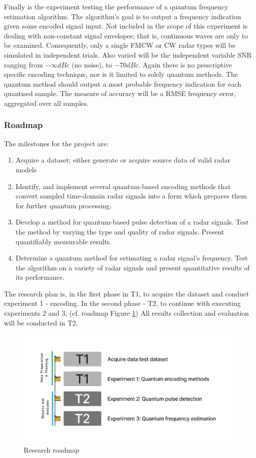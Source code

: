 Finally is the experiment testing the performance of a quantum frequency estimation algorithm.
The algorithm's goal is to output a frequency indication given some encoded signal input.
Not included in the scope of this experiment is dealing with non-constant signal envelopes; that is, continuous waves are only to be examined.
Consequently, only a single \ac{FMCW} or \ac{CW} radar types will be simulated in independent trials.
Also varied will be the independent variable \ac{SNR} ranging from $-\infty dBc$ (no noise), to $-70dBc$.
Again there is no prescriptive specific encoding technique, nor is it limited to solely quantum
methods.
The quantum method should output a most probable frequency indication for each quantised sample.
The measure of accuracy will be a \ac{RMSE} frequency error, aggregated over all samples. 


\subsubsection{Roadmap}\label{sec:research_plan}
The milestones for the project are:
\begin{enumerate}
    \item Acquire a dataset; either generate or acquire source data of valid radar models
    \item Identify, and implement several quantum-based encoding methods that convert sampled time-domain radar signals into a form which prepares them for further quantum processing.
    \item Develop a method for quantum-based pulse detection of a radar signals. Test the method by varying the type and quality of radar signals. Present quantifiably measurable results.
    \item Determine a quantum method for estimating a radar signal’s frequency. Test the algorithm on a variety of radar signals and present quantitative results of its performance.
\end{enumerate}

The research plan is, in the first phase in T1, to acquire the dataset and conduct experiment 1 - encoding.
In the second phase - T2, to continue with executing experiments 2 and 3, (cf. roadmap Figure \ref{fig:roadmap})
All results collection and evaluation will be conducted in T2.

\begin{figure}[ht]
    \centering
    \includegraphics[width=1\textwidth]{Figures/roadmap.png}
    \caption{Research roadmap}
    \label{fig:roadmap}
\end{figure}
